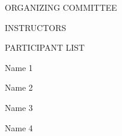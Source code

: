 \documentclass[11pt]{report}
\begin{document}
\begin{center} ORGANIZING COMMITTEE \end{center}

\begin{multicols}{2}
    \begin{flushleft} 



    \end{flushleft}
\end{multicols}


\begin{center} INSTRUCTORS \end{center}

\begin{multicols}{2}
    \begin{flushleft} 



    \end{flushleft}
\end{multicols}

\newpage

\begin{center} PARTICIPANT LIST \end{center}

\begin{multicols}{2}
    \begin{flushleft} 
        Name 1

        Name 2

        Name 3

        Name 4
    \end{flushleft}
\end{multicols}

\newpage

\tableofcontents


\end{document}
